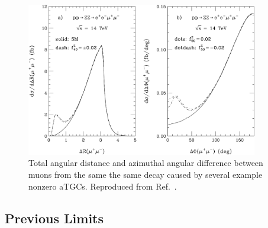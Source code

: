 \begin{figure}[htbp]
  \begin{center}
    \includegraphics[width=0.9\textwidth]{phenomenology/r_phi_lhc_4l.pdf}
    \caption[Lepton angular correlations resulting from nonzero aTGCs]{
        Total angular distance and azimuthal angular difference between muons from the same the same {\PZ} decay caused by several example nonzero aTGCs.
        Reproduced from Ref.~\cite{Baur:2000ae}.
      }\label{fig:aTGCangles}
  \end{center}
\end{figure}



\subsection{Previous Limits}\label{sec:aTGCLit}

